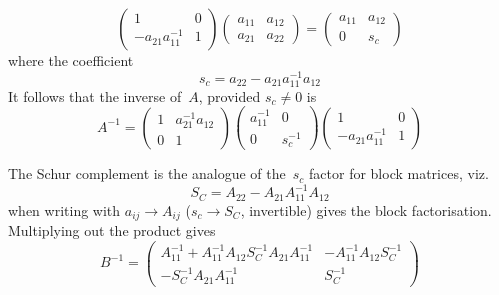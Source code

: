 \begin{equation}
\begin{pmatrix}
1 & 0 \\
-a_{21} a_{11}^{-1} & 1
\end{pmatrix}
\begin{pmatrix}
a_{11} & a_{12} \\
a_{21} & a_{22}
\end{pmatrix}
=
\begin{pmatrix}
a_{11} & a_{12} \\
0 & s_c
\end{pmatrix}
\end{equation}
where the coefficient 
\begin{equation}\label{eq:scaschur}
s_c=a_{22} - a_{21} a_{11}^{-1} a_{12}
\end{equation}
It follows that the inverse of~$A$, provided $s_c\neq0$  is
\begin{equation}\label{eq:sinv3fac}
A^{-1}=
\begin{pmatrix}
1 & a_{21}^{-1} a_{12} \\
0 & 1
\end{pmatrix}
\begin{pmatrix}
a_{11}^{-1} & 0 \\
0 & s_c^{-1}
\end{pmatrix}
\begin{pmatrix}
1 & 0 \\
-a_{21} a_{11}^{-1} & 1
\end{pmatrix}
\end{equation}


The Schur complement is the analogue of the~$s_c$ factor for block matrices, viz.
\begin{equation}\label{eq:schur}
S_C=A_{22} - A_{21} A_{11}^{-1} A_{12}
\end{equation}
when writing  with $a_{ij}\rightarrow A_{ij}$ ($s_c\rightarrow S_C$, invertible) gives 
the block factorisation. Multiplying out the product gives
\begin{equation}\label{eq:matrixth0}
B^{-1}=
\begin{pmatrix}
A_{11}^{-1} 
+A_{11}^{-1}A_{12}S_C^{-1}A_{21}A_{11}^{-1} & -A_{11}^{-1}A_{12}S_C^{-1} \\
-S_C^{-1}A_{21}A_{11}^{-1} & S_C^{-1}
\end{pmatrix}
\end{equation}


